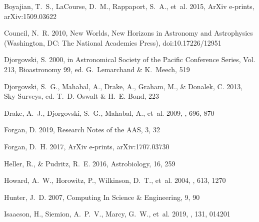 \documentclass[twocolumn]{aastex62}
\begin{document}
\begin{thebibliography}{}
{Boyajian}, T.~S., {LaCourse}, D.~M., {Rappaport}, S.~A., {et~al.} 2015, ArXiv
  e-prints, arXiv:1509.03622

Council, N.~R. 2010, New Worlds, New Horizons in Astronomy and Astrophysics
  (Washington, DC: The National Academies Press), doi:10.17226/12951

{Djorgovski}, S. 2000, in Astronomical Society of the Pacific Conference
  Series, Vol. 213, Bioastronomy 99, ed. G.~{Lemarchand} \& K.~{Meech}, 519

{Djorgovski}, S.~G., {Mahabal}, A., {Drake}, A., {Graham}, M., \& {Donalek}, C.
  2013, {Sky Surveys}, ed. T.~D. {Oswalt} \& H.~E. {Bond}, 223

{Drake}, A.~J., {Djorgovski}, S.~G., {Mahabal}, A., {et~al.} 2009, \apj, 696,
  870

Forgan, D. 2019, Research Notes of the {AAS}, 3, 32

{Forgan}, D.~H. 2017, ArXiv e-prints, arXiv:1707.03730

{Heller}, R., \& {Pudritz}, R.~E. 2016, Astrobiology, 16, 259

{Howard}, A.~W., {Horowitz}, P., {Wilkinson}, D.~T., {et~al.} 2004, \apj, 613,
  1270

Hunter, J.~D. 2007, Computing In Science \& Engineering, 9, 90

{Isaacson}, H., {Siemion}, A.~P.~V., {Marcy}, G.~W., {et~al.} 2019, \pasp, 131,
  014201


\end{thebibliography}
\end{document}
